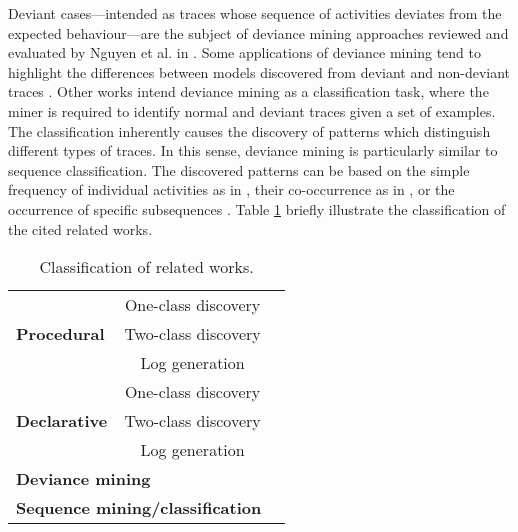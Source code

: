 Deviant cases---intended as traces whose sequence of activities deviates from the expected behaviour---are the subject of deviance mining approaches reviewed and evaluated by Nguyen et al. in \cite{2016-Nguyen}. Some applications of deviance mining tend to highlight the differences between models discovered from deviant and non-deviant traces \cite{2014-Suriadi,2014-Armas}. Other works intend deviance mining as a classification task, where the miner is required to identify normal and deviant traces given a set of examples. The classification inherently causes the discovery of patterns which distinguish different types of traces. In this sense, deviance mining is particularly similar to sequence classification. The discovered patterns can be based on the simple frequency of individual activities as in \cite{2013-Suriadi,2015-Partington}, their co-occurrence as in \cite{2011-Swinnen}, or the occurrence of specific subsequences \cite{2013-Bose,2007-Lo,2016-Bernardi}.
Table \ref{tab:rw} briefly illustrate the classification of the cited related works.
\begin{table} [ht]
	\centering
	\renewcommand{\arraystretch}{1.5}
		\begin{tabular} {l | c |>{\centering\arraybackslash}m{}}
		\toprule
			\multirow{3}{*}{\textbf{Procedural} }& One-class discovery &\cite{2003-Weijters,2004-Aalst,2007-Gunther,2010-Aalst,2013-Leemans,2015-Guo,2017-Augusto,YUREK:2018ww} \\ \cline{2-3}		
				& Two-class discovery & \cite{2015-Ponce,2018-Ponce,2006-Ferreira} \\ \cline{2-3}	
				& Log generation & \cite{2009-Goedertier, 2014-Stocker,2010-Hee} \\ \midrule
			\multirow{3}{*}{\textbf{Declarative} }& One-class discovery &  \cite{2011-Maggi,2012-Maggi,2012-Schunselaar, 2015-DiCiccio, 2017-DiCiccio, 2021-Back} \\ \cline{2-3}						
				& Two-class discovery & \cite{2007-Lamma,2009-Chesani,2010-Bellodi,2016-Bellodi,slaats_weighing_2021,2007b-Lamma,2018-Neider,2019-Camacho,2019-Riener} \\ \cline{2-3}
				& Log generation & \cite{2019-Chesani,2017-Chesani,2020-Loreti} \\ \midrule
			\multicolumn{2}{l|}{\textbf{Deviance mining} } & \cite{2016-Nguyen,2014-Suriadi,2014-Armas,2013-Suriadi,2015-Partington,2013-Bose,2007-Lo,2016-Bernardi,2011-Swinnen} \\ \midrule
			\multicolumn{2}{l|}{\textbf{Sequence mining/classification} } & \cite{2016-Fowkes,2017-Egho,2000-Zaki,2014-Lam,2020-DeSmedt} \\ 
		\bottomrule
		\end{tabular}
		\caption{Classification of related works.}
		\label{tab:rw}
\end{table}
 
